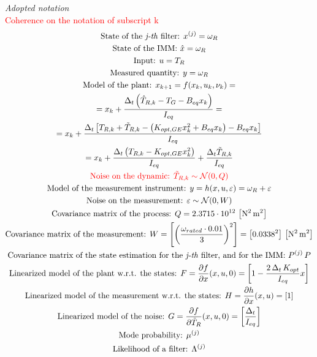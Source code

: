 \textit{Adopted notation}\\
\textcolor{red}{Coherence on the notation of subscript k}
\begin{multline}
  \text{State of the \textit{j-th} filter: } x^{(j)} = \omega_{R} \\
  \text{State of the IMM: } \hat{x} = \omega_R\\
  \text{Input: } u = T_{R}\\
  \text{Measured quantity: } y = \omega_{R} \\
  \text{Model of the plant: }  x_{k+1} = f(x_k, u_k, \nu_k) = \\ \notag
  = x_k + \frac{\Delta_t\left(\hat{T}_{R,k} - T_G - B_{eq}x_k\right)}{I_{eq}}=\\ \notag
  = x_k + \frac{\Delta_t\left[T_{R,k} + \tilde{T}_{R,k} - \left(K_{opt,GE}x_k^2 + B_{eq}x_k \right) - B_{eq}x_k\right]}{I_{eq}}\\ \notag
  = x_k + \frac{\Delta_t\left(T_{R,k}  - K_{opt,GE}x_k^2 \right)}{I_{eq}} + \frac{\Delta_t \tilde{T}_{R,k}}{I_{eq}}\\ 
  \textcolor{red}{\text{Noise on the dynamic: } \tilde{T}_{R,k} \sim \mathcal{N}(0, Q)} \\ \label{eq:noise_Q}
  \text{Model of the measurement instrument: } y = h(x, u, \varepsilon) = \omega_{R} + \varepsilon \\
  \text{Noise on the measurement: } \varepsilon \sim \mathcal{N}(0, W)  \\
  \text{Covariance matrix of the process: } Q = 2.3715\cdot10^{12} \, \left[\si{\square\newton\square \meter}\right]\\
  \text{Covariance matrix of the measurement: } W = \left[\left(\frac{\omega_{rated}\cdot 0.01}{3}\right)^2\right] = \left[0.0338^2\right] \, \left[\si{\square\newton\square \meter}\right]\\
  \text{Covariance matrix of the state estimation for the \textit{j-th} filter, and for the IMM: } P^{(j)} \, P\\
  \text{Linearized model of the plant w.r.t. the states: } F = \frac{\partial f}{\partial x}(x, u, 0) = \left[1-\frac{2\,\Delta_t\,K_{opt}}{I_{eq}}x\right]\\
  \text{Linearized model of the measurement w.r.t. the states: } H = \frac{\partial h}{\partial x}(x, u) = \left[1\right]\\
  \text{Linearized model of the noise: } G = \frac{\partial f}{\partial \tilde{T}_R}(x, u, 0)=\left[\frac{\Delta_t}{I_{eq}}\right]\\
  \text{Mode probability: } \mu^{(j)}\\
  \text{Likelihood of a filter: } \Lambda^{(j)}
\end{multline}


